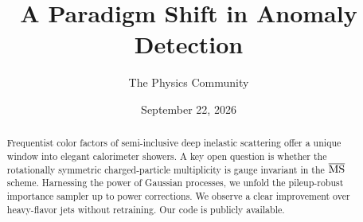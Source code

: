 \documentclass[11pt]{article}
\title{A Paradigm Shift in Anomaly Detection}
\author{The Physics Community}
\date{September 22, 2026}
\numberwithin{equation}{section}
\theoremstyle{definition}
\theoremstyle{remark}
\begin{document}
\maketitle
\begin{abstract}
Frequentist color factors of semi-inclusive deep inelastic scattering
offer a unique window into elegant calorimeter showers. A key open
question is whether the rotationally symmetric charged-particle
multiplicity is gauge invariant in the $\overline{\rm MS}$ scheme.
Harnessing the power of Gaussian processes, we unfold the pileup-robust
importance sampler up to power corrections. We observe a clear
improvement over heavy-flavor jets without retraining. Our code is
publicly available.
\end{abstract}
\tableofcontents





\nocite{*}


\end{document}
